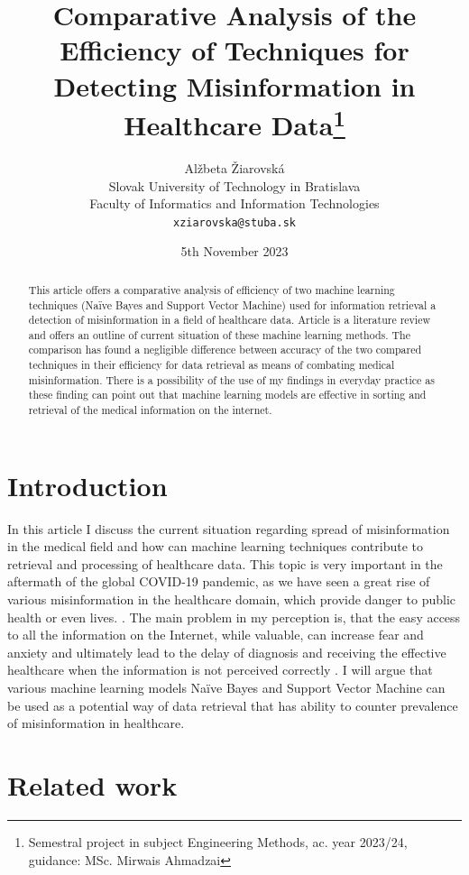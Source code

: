 \documentclass[11pt ,english,a4paper]{article}
\title{Comparative Analysis of the Efficiency of Techniques for Detecting Misinformation in Healthcare Data\thanks{Semestral project in subject Engineering Methods, ac. year 2023/24, guidance: MSc. Mirwais Ahmadzai}}
\author{Alžbeta Žiarovská\\[2pt]
	{\small Slovak University of Technology in Bratislava}\\
	{\small Faculty of Informatics and Information Technologies}\\
	{\small \texttt{xziarovska@stuba.sk}}
	}
\date{\small 5th November 2023}
\begin{document}
\maketitle
\newpage

\begin{abstract}
This article offers a comparative analysis of efficiency of two machine learning techniques (Naïve Bayes and Support Vector Machine) used for information retrieval a detection of misinformation in a field of healthcare data. Article is a literature review and offers an outline of current situation of these machine learning methods. The comparison has found a negligible difference between accuracy of the two compared techniques in their efficiency for data retrieval as means of combating medical misinformation. There is a possibility of the use of my findings in everyday practice as these finding can point out that machine learning models are effective in sorting and retrieval of the medical information on the internet. 
\end{abstract}
\newpage

\section{Introduction}\label{intro}

In this article I discuss the current situation regarding spread of misinformation in the medical field and how can machine learning techniques contribute to retrieval and processing of healthcare data. This topic is very important in the aftermath of the global COVID-19 pandemic, as we have seen a great rise of various misinformation in the healthcare domain, which provide danger to public health or even lives. \cite{war18dr}. The main problem in my perception is, that the easy access to all the information on the Internet, while valuable, can increase fear and anxiety and ultimately lead to the delay of diagnosis and receiving the effective healthcare when the information is not perceived correctly \cite{wa19sys}. I will argue that various machine learning models Naïve Bayes and Support Vector Machine can be used as a potential way of data retrieval that has ability to counter prevalence of misinformation in healthcare.

\section{Related work}
\end{document}
